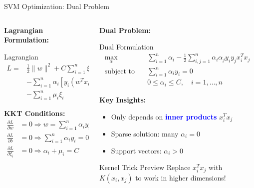 \documentclass[8pt,aspectratio=1610]{beamer}
\begin{document}
\begin{frame}{SVM Optimization: Dual Problem}
\begin{columns}[t]
\begin{column}{0.48\textwidth}
\textbf{Lagrangian Formulation:}
\vspace{0.2cm}

\begin{block}{Lagrangian}
\begin{align}
L = &\frac{1}{2}\|w\|^2 + C\sum_{i=1}^{n}\xi_i \\
&- \sum_{i=1}^{n}\alpha_i[y_i(w^T x_i + b) - 1 + \xi_i] \\
&- \sum_{i=1}^{n}\mu_i\xi_i
\end{align}
\end{block}

\vspace{0.3cm}
\textbf{KKT Conditions:}
\begin{align}
\frac{\partial L}{\partial w} &= 0 \Rightarrow w = \sum_{i=1}^{n}\alpha_i y_i x_i \\
\frac{\partial L}{\partial b} &= 0 \Rightarrow \sum_{i=1}^{n}\alpha_i y_i = 0 \\
\frac{\partial L}{\partial \xi_i} &= 0 \Rightarrow \alpha_i + \mu_i = C
\end{align}
\end{column}

\begin{column}{0.48\textwidth}
\textbf{Dual Problem:}
\vspace{0.2cm}

\begin{block}{Dual Formulation}
\begin{align}
\max_{\alpha} \quad &\sum_{i=1}^{n}\alpha_i - \frac{1}{2}\sum_{i,j=1}^{n}\alpha_i\alpha_j y_i y_j x_i^T x_j \\
\text{subject to} \quad &\sum_{i=1}^{n}\alpha_i y_i = 0 \\
&0 \leq \alpha_i \leq C, \quad i = 1,\ldots,n
\end{align}
\end{block}

\vspace{0.3cm}
\textbf{Key Insights:}
\begin{itemize}
\setlength{\itemsep}{1pt}
\item Only depends on \textcolor{blue}{\textbf{inner products}} $x_i^T x_j$
\item Sparse solution: many $\alpha_i = 0$
\item Support vectors: $\alpha_i > 0$
\end{itemize}

\vspace{0.3cm}
\begin{alertblock}{Kernel Trick Preview}
Replace $x_i^T x_j$ with $K(x_i, x_j)$ to work in higher dimensions!
\end{alertblock}
\end{column}
\end{columns}
\end{frame}
\end{document}
